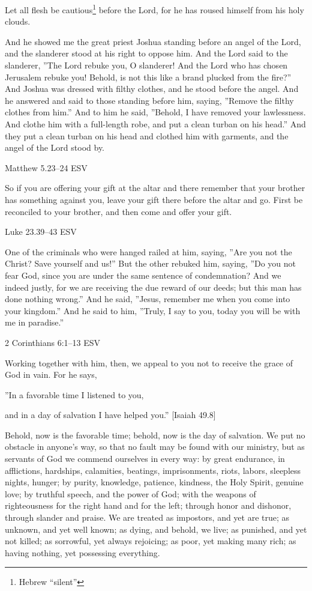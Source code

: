 \documentclass[
]{article}
\newcommand{\RL}[1]{\beginR #1\endR}
\begin{document}
Let all flesh be cautious\footnote{Hebrew ``silent''} before the Lord,
for he has roused himself from his holy clouds.

And he showed me the great priest Joshua standing before an angel of the
Lord, and the slanderer stood at his right to oppose him. And the Lord
said to the slanderer, \RL{''}The Lord rebuke you, O slanderer! And the
Lord who has chosen Jerusalem rebuke you! Behold, is not this like a
brand plucked from the fire?'' And Joshua was dressed with filthy
clothes, and he stood before the angel. And he answered and said to
those standing before him, saying, \RL{''}Remove the filthy clothes from
him.'' And to him he said, \RL{''}Behold, I have removed your
lawlessness. And clothe him with a full-length robe, and put a clean
turban on his head.'' And they put a clean turban on his head and
clothed him with garments, and the angel of the Lord stood by.

Matthew 5.23--24 ESV

So if you are offering your gift at the altar and there remember that
your brother has something against you, leave your gift there before the
altar and go. First be reconciled to your brother, and then come and
offer your gift.

Luke 23.39--43 ESV

One of the criminals who were hanged railed at him, saying, \RL{''}Are
you not the Christ? Save yourself and us!'' But the other rebuked him,
saying, \RL{''}Do you not fear God, since you are under the same
sentence of condemnation? And we indeed justly, for we are receiving the
due reward of our deeds; but this man has done nothing wrong.'' And he
said, \RL{''}Jesus, remember me when you come into your kingdom.'' And
he said to him, \RL{''}Truly, I say to you, today you will be with me in
paradise.''

2 Corinthians 6:1--13 ESV

Working together with him, then, we appeal to you not to receive the
grace of God in vain. For he says,

\RL{''}In a favorable time I listened to you,

and in a day of salvation I have helped you.'' {[}Isaiah 49.8{]}

Behold, now is the favorable time; behold, now is the day of salvation.
We put no obstacle in anyone\RL{'}s way, so that no fault may be found
with our ministry, but as servants of God we commend ourselves in every
way: by great endurance, in afflictions, hardships, calamities,
beatings, imprisonments, riots, labors, sleepless nights, hunger; by
purity, knowledge, patience, kindness, the Holy Spirit, genuine love; by
truthful speech, and the power of God; with the weapons of righteousness
for the right hand and for the left; through honor and dishonor, through
slander and praise. We are treated as impostors, and yet are true; as
unknown, and yet well known; as dying, and behold, we live; as punished,
and yet not killed; as sorrowful, yet always rejoicing; as poor, yet
making many rich; as having nothing, yet possessing everything.
\end{document}
